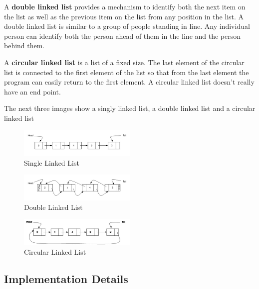        A \textbf{double linked list} provides a mechanism to identify both the next item on the list as well as the previous item on the  list from any position in the list.  A double linked list is similar to a group of people standing in line.  Any individual person can identify both the person ahead of them in the line and the person behind them.
       
       A \textbf{circular linked list}  is a list of a fixed size.  The last element of the circular list is connected to the first element of the list so that from the last element the program can easily return to the first element.  A circular linked list doesn't really have an end point.
   
       The next three images show a singly linked list, a double linked list and a circular linked list     


\begin{figure}[H]
\centering
\includegraphics[width=0.5\textwidth]{pictures/linked_list.jpg}
\caption{Single Linked List}
\label{fig:single}
\end{figure}

   

\begin{figure}[H]
\centering
\includegraphics[width=0.5\textwidth]{pictures/double_linked_list.jpg}
\caption{Double Linked List}
\label{fig:double}
\end{figure}


\begin{figure}[H]
\centering
\includegraphics[width=0.5\textwidth]{pictures/circular_linked_list.jpg}
\caption{Circular Linked List}
\label{fig:circular}
\end{figure}

\subsection{Implementation Details}  

